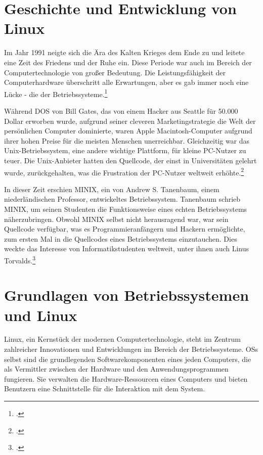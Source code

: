 
\section{Geschichte und Entwicklung von Linux}
Im Jahr 1991 neigte sich die Ära des Kalten Krieges dem Ende zu und leitete eine Zeit des Friedens und der Ruhe ein. Diese Periode war auch im Bereich der
Computertechnologie von großer Bedeutung. Die Leistungsfähigkeit der
Computerhardware überschritt alle Erwartungen, aber es gab immer noch eine Lücke
- die der Betriebssysteme.\footcite[1]{Hasan2004}

Während DOS von Bill Gates, das von einem Hacker aus Seattle für 50.000 Dollar
erworben wurde, aufgrund seiner cleveren Marketingstrategie die Welt der
persönlichen Computer dominierte, waren Apple Macintosh-Computer aufgrund ihrer
hohen Preise für die meisten Menschen unerreichbar. Gleichzeitig war das
Unix-Betriebssystem, eine andere wichtige Plattform, für kleine PC-Nutzer zu
teuer. Die Unix-Anbieter hatten den Quellcode, der einst in Universitäten
gelehrt wurde, zurückgehalten, was die Frustration der PC-Nutzer weltweit
erhöhte.\footcite[1]{Hasan2004}

In dieser Zeit erschien MINIX, ein von Andrew S\@. Tanenbaum, einem
niederländischen Professor, entwickeltes Betriebssystem. Tanenbaum schrieb MINIX,
um seinen Studenten die Funktionsweise eines echten Betriebssystems
näherzubringen. Obwohl MINIX selbst nicht herausragend war, war sein Quellcode
verfügbar, was es Programmieranfängern und Hackern ermöglichte, zum ersten Mal
in die Quellcodes eines Betriebssystems einzutauchen. Dies weckte das Interesse
von Informatikstudenten weltweit, unter ihnen auch Linus Torvalds.\footcite[1]{Hasan2004} 

\newpage

\section{Grundlagen von Betriebssystemen und Linux}
Linux, ein Kernstück der modernen Computertechnologie, steht im Zentrum
zahlreicher Innovationen und Entwicklungen im Bereich der Betriebssysteme.
\Glspl{OS} selbst sind die grundlegenden Softwarekomponenten eines
jeden Computers, die als Vermittler zwischen der Hardware und den
Anwendungsprogrammen fungieren. Sie verwalten die Hardware-Ressourcen eines
Computers und bieten Benutzern eine Schnittstelle für die Interaktion mit dem
System.

